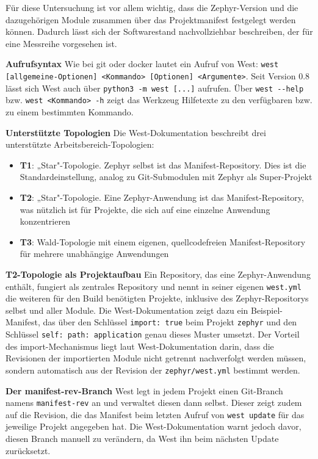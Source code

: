 Für diese Untersuchung ist vor allem wichtig, dass die Zephyr-Version und die dazugehörigen Module zusammen über das Projektmanifest festgelegt werden können. Dadurch lässt sich der Softwarestand nachvollziehbar beschreiben, der für eine Messreihe vorgesehen ist.

\textbf{Aufrufsyntax} Wie bei git oder docker lautet ein Aufruf von West: \lstinline[style=fileinline]|west [allgemeine-Optionen] <Kommando> [Optionen] <Argumente>|. Seit Version 0.8 lässt sich West auch über \lstinline[style=fileinline]|python3 -m west [...]| aufrufen. Über \lstinline[style=fileinline]|west --help| bzw. \lstinline[style=fileinline]|west <Kommando> -h| zeigt das Werkzeug Hilfetexte zu den verfügbaren bzw. zu einem bestimmten Kommando.

\textbf{Unterstützte Topologien} Die West-Dokumentation beschreibt drei unterstützte Arbeitsbereich-Topologien:

\begin{itemize}
\item \textbf{T1}: „Star"-Topologie. Zephyr selbst ist das Manifest-Repository. Dies ist die Standardeinstellung, analog zu Git-Submodulen mit Zephyr als Super-Projekt
\item \textbf{T2}: „Star"-Topologie. Eine Zephyr-Anwendung ist das Manifest-Repository, was nützlich ist für Projekte, die sich auf eine einzelne Anwendung konzentrieren
\item \textbf{T3}: Wald-Topologie mit einem eigenen, quellcodefreien Manifest-Repository für mehrere unabhängige Anwendungen
\end{itemize}
\textbf{T2-Topologie als Projektaufbau} Ein Repository, das eine Zephyr-Anwendung enthält, fungiert als zentrales Repository und nennt in seiner eigenen \lstinline[style=fileinline]|west.yml| die weiteren für den Build benötigten Projekte, inklusive des Zephyr-Repositorys selbst und aller Module. Die West-Dokumentation zeigt dazu ein Beispiel-Manifest, das über den Schlüssel \lstinline[style=fileinline]|import: true| beim Projekt \lstinline[style=fileinline]|zephyr| und den Schlüssel \lstinline[style=fileinline]|self: path: application| genau dieses Muster umsetzt. Der Vorteil des import-Mechanismus liegt laut West-Dokumentation darin, dass die Revisionen der importierten Module nicht getrennt nachverfolgt werden müssen, sondern automatisch aus der Revision der \lstinline[style=fileinline]|zephyr/west.yml| bestimmt werden.

\textbf{Der manifest-rev-Branch} West legt in jedem Projekt einen Git-Branch namens \lstinline[style=fileinline]|manifest-rev| an und verwaltet diesen dann selbst. Dieser zeigt zudem auf die Revision, die das Manifest beim letzten Aufruf von \lstinline[style=fileinline]|west update| für das jeweilige Projekt angegeben hat. Die West-Dokumentation warnt jedoch davor, diesen Branch manuell zu verändern, da West ihn beim nächsten Update zurücksetzt.

